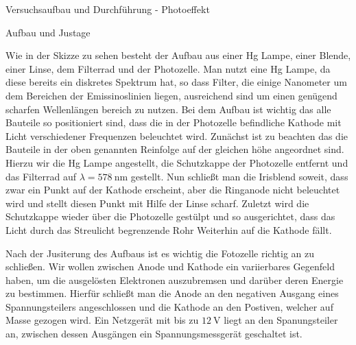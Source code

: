 \documentclass[pdftex, a4paper,11pt, twoside, ngerman]{report}
\begin{document}
  \begin{chapter}{Versuchsaufbau und Durchführung - Photoeffekt}
    \label{chp:Aufbau}
        
    \begin{section}{Aufbau und Justage}
      \label{chp:Aufbau:sec:ERSTERTEIL}
      
    Wie in der Skizze zu sehen besteht der Aufbau aus einer Hg Lampe, einer Blende, einer Linse, dem Filterrad und der Photozelle. 
    Man nutzt eine Hg Lampe, da diese bereits ein diskretes Spektrum hat, so dass Filter, die einige Nanometer um dem Bereichen der Emissinoslinien liegen, ausreichend sind um einen genügend scharfen Wellenlängen bereich zu nutzen. 
      Bei dem Aufbau ist wichtig das alle Bauteile so positioniert sind, dass die in der Photozelle befindliche Kathode mit Licht verschiedener Frequenzen beleuchtet wird.
    Zunächst ist zu beachten das die Bauteile in der oben genannten Reinfolge auf der gleichen höhe angeordnet sind.
    Hierzu wir die Hg Lampe angestellt, die Schutzkappe der Photozelle entfernt und das Filterrad auf $\lambda = \SI{578}{\nano\meter}$ gestellt.
    Nun schließt man die Irisblend soweit, dass zwar ein Punkt auf der Kathode erscheint, aber die Ringanode nicht beleuchtet wird und stellt diesen Punkt mit Hilfe der Linse scharf.
    Zuletzt wird die Schutzkappe wieder über die Photozelle gestülpt und so ausgerichtet, dass das Licht durch das Streulicht begrenzende Rohr Weiterhin auf die Kathode fällt.

    Nach der Jusiterung des Aufbaus ist es wichtig die Fotozelle richtig an zu schließen.
    Wir wollen zwischen Anode und Kathode ein variierbares Gegenfeld haben, um die ausgelösten Elektronen auszubremsen und darüber deren Energie zu bestimmen.
    Hierfür schließt man die Anode an den negativen Ausgang eines Spannungsteilers angeschlossen und die Kathode an den Postiven, welcher auf Masse gezogen wird.
    Ein Netzgerät mit bis zu $\SI{12}{\volt}$ liegt an den Spanungsteiler an, zwischen dessen Ausgängen ein Spannungsmessgerät geschaltet ist.
      

\end{section}
\end{chapter}
\end{document}

